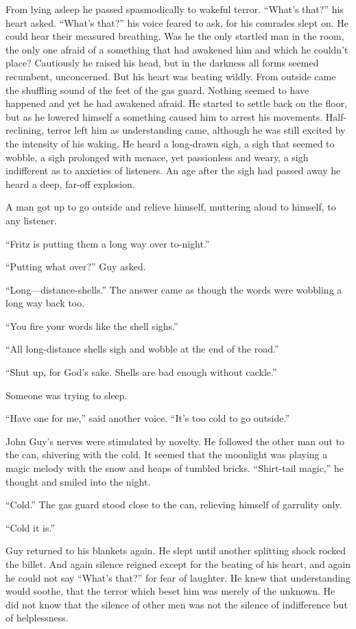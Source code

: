 From lying asleep he passed spasmodically to wakeful terror. ``What's that?'' his heart asked. 
``What's that?'' his voice feared to ask, for his comrades slept on. He could hear their 
measured breathing. Was he the only startled man in the room, the only one afraid of a something 
that had awakened him and which he couldn't place? Cautiously he raised his head, but in the 
darkness all forms seemed recumbent, unconcerned. But his heart was beating wildly. From 
outside came the shuffling sound of the feet of the gas guard. Nothing seemed to have happened 
and yet he had awakened afraid. He started to settle back on the floor, but as he lowered himself 
a something caused him to arrest his movements. Half-reclining, terror left him as understanding 
came, although he was still excited by the intensity of his waking. He heard a long-drawn sigh, a 
sigh that seemed to wobble, a sigh prolonged with menace, yet passionless and weary, a sigh 
indifferent as to anxieties of listeners. An age after the sigh had passed away he heard a deep, 
far-off explosion.

A man got up to go outside and relieve himself, muttering aloud to himself, to any listener.

``Fritz is putting them a long way over to-night.''

``Putting what over?'' Guy asked.

``Long---distance-shells.'' The answer came as though the words were wobbling a long way back too.

``You fire your words like the shell sighs.''

``All long-distance shells sigh and wobble at the end of the road.''

``Shut up, for God's sake. Shells are bad enough without cackle.''

Someone was trying to sleep.

``Have one for me,'' said another voice. ``It's too cold to go outside.''

John Guy's nerves were stimulated by novelty. He followed the other man out to the can, shivering 
with the cold. It seemed that the moonlight was playing a magic melody with the snow and heaps of 
tumbled bricks. ``Shirt-tail magic,'' he thought and smiled into the night.

``Cold.'' The gas guard stood close to the can, relieving himself of garrulity only.

``Cold it is.''

Guy returned to his blankets again. He slept until another splitting shock rocked the billet. And 
again silence reigned except for the beating of his heart, and again he could not say ``What's that?'' 
for fear of laughter. He knew that understanding would soothe, that the terror which beset him was 
merely of the unknown. He did not know that the silence of other men was not the silence of 
indifference but of helplessness.

